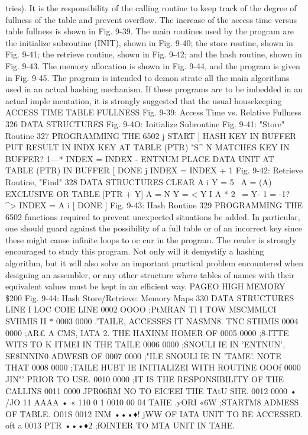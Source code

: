 \documentclass{book}
\begin{document}
{{{{{{{{{{{{{{{{{{{{{{{{{{{{{{{{{{{{{{{{{{{{{{{{{{{{{{{{{{{{{{{{{{{{{{{{{{{{{{{{{{{{{{{{{{tries). It is the responsibility of the calling routine to keep track of the
degree of fullness of the table and prevent overflow.
The increase of the access time versus table fullness is shown in
Fig. 9-39. The main routines used by the program are the initialize
subroutine (INIT), shown in Fig. 9-40; the store routine, shown in
Fig. 9-41; the retrieve routine, shown in Fig. 9-42; and the hash routine,
shown in Fig. 9-43. The memory allocation is shown in Fig. 9-44,
and the program is given in Fig. 9-45. The program is intended to demon
strate all the main algorithms used in an actual hashing
mechanism. If these programs are to be imbedded in an actual imple
mentation, it is strongly suggested that the usual housekeeping
ACCESS
TIME
TABLE FULLNESS
Fig. 9-39: Access Time vs. Relative Fullness
326
DATA STRUCTURES
Fig. 9-4O: Initialize Subroutine
Fig. 9-41: "Store" Routine
327
PROGRAMMING THE 6502
j START ]
HASH KEY IN BUFFER
PUT RESULT IN INDX
KEY AT TABLE (PTR) "S^ N
MATCHES KEY IN BUFFER?
1—*
INDEX = INDEX - ENTNUM
PLACE DATA UNIT AT
TABLE (PTR) IN BUFFER
[ DONE j
INDEX = INDEX + 1
Fig. 9-42: Retrieve Routine, "Find"
328
DATA STRUCTURES
CLEAR A
i
Y = 5
\
A = (A) EXCLUSIVE
OR TABLE [PTR + Y]
A =
N
Y =
< Y
I
A * 2
\
= Y- 1
= -1? ^>
INDEX = A
i
[ DONE ]
Fig. 9-43: Hash Routine
329
PROGRAMMING THE 6502
functions required to prevent unexpected situations be added. In
particular, one should guard against the possibility of a full table
or of an incorrect key since these might cause infinite loops to oc
cur in the program. The reader is strongly encouraged to study
this program. Not only will it demystify a hashing algorithm, but
it will also solve an important practical problem encountered when
designing an assembler, or any other structure where tables of
names with their equivalent values must be kept in an efficient
way.
PAGEO
HIGH MEMORY
\$200
Fig. 9-44: Hash Store/Retrieve: Memory Maps
330
DATA STRUCTURES
LINE I LOC COIE LINE
0002 OOOO ;PtMRAN Tl I TOW MSCMMLCI SVHMIS II *
0003 0000 .'TAILE, ACCESSES IT NASMN8. TNC STHMIS
0004 0000 ;AR£ A CMS, IATA 2. THE HAXINM HOMER OF
0005 0000 ;8-ITTE WITS TO K ITMEI IN THE TAILE
0006 0000 ;SNOULI IE IN 'ENTNUN', SE8INNIN0 ADWESB OF
0007 0000 ;"ILE SNOULI IE IN 'TAME'. NOTE THAT
0008 0000 ;TAILE HUBT IE INITIALIZEI WITH ROUTINE
OOOf 0000 JIN"' PRIOR TO USE.
0010 0000 ;IT IS THE RESPONSIBILITY OF THE CALLINS
0011 0000 JPR06RM NO TO EICEEI THE TAtU SHE.
0012 0000 •
/JO 11 AAAA • « 110
0 1 0010 00 04 TAHE .yORI «6W ;STARTM8 ADMESS OF TABLE.
O01S 0012 INM •••♦! jWW OF IATA UNIT TO BE ACCESSED.
oft a 0013 PTR •••♦2 ;fOINTER TO MTA UNIT IN TAHE.
}}}}}}}}}}}}}}}}}}}}}}}}}}}}}}}}}}}}}}}}}}}}}}}}}}}}}}}}}}}}}}}}}}}}}}}}}}}}}}}}}}}}}}}}}}
\end{document}
